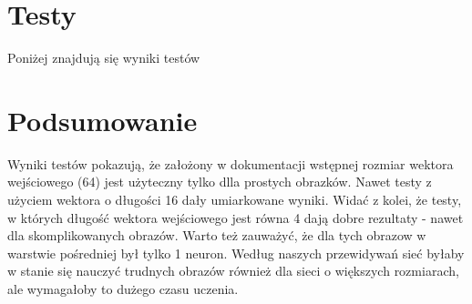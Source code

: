 \documentclass[12pt,a4paper,oneside]{article}
\begin{document}
\section{Testy}
Poniżej znajdują się wyniki testów

\section{Podsumowanie}
Wyniki testów pokazują, że założony w dokumentacji wstępnej rozmiar wektora wejściowego (64) jest użyteczny tylko dlla prostych obrazków. Nawet testy z użyciem wektora o długości 16 dały umiarkowane wyniki. Widać z kolei, że testy, w których długość wektora wejściowego jest równa 4 dają dobre rezultaty - nawet dla skomplikowanych obrazów. Warto też zauważyć, że dla tych obrazow w warstwie pośredniej był tylko 1 neuron. Według naszych przewidywań sieć byłaby w stanie się nauczyć trudnych obrazów również dla sieci o większych rozmiarach, ale wymagałoby to dużego czasu uczenia.
\end{document}
